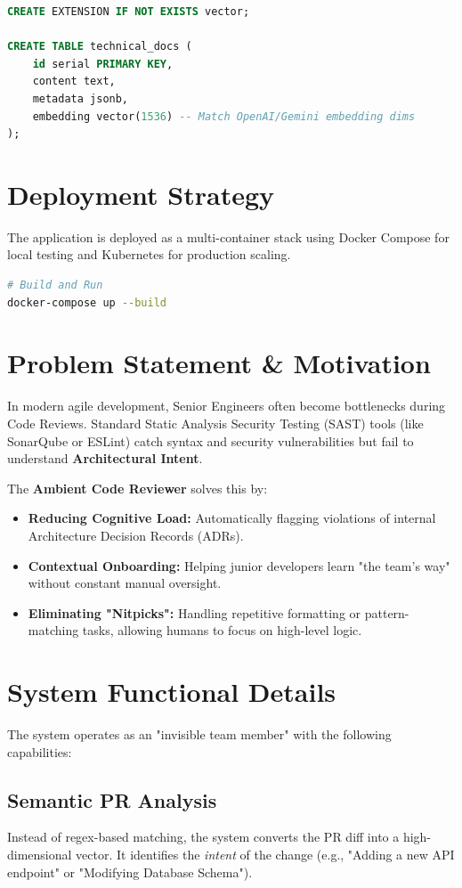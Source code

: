 \documentclass[11pt]{article}
\begin{document}
\begin{lstlisting}[language=sql, caption=Database Schema]
CREATE EXTENSION IF NOT EXISTS vector;

CREATE TABLE technical_docs (
    id serial PRIMARY KEY,
    content text,
    metadata jsonb,
    embedding vector(1536) -- Match OpenAI/Gemini embedding dims
);
\end{lstlisting}

\section{Deployment Strategy}
The application is deployed as a multi-container stack using Docker Compose for local testing and Kubernetes for production scaling.

\begin{lstlisting}[language=bash]
# Build and Run
docker-compose up --build
\end{lstlisting}
\section{Problem Statement \& Motivation}
In modern agile development, Senior Engineers often become bottlenecks during Code Reviews. Standard Static Analysis Security Testing (SAST) tools (like SonarQube or ESLint) catch syntax and security vulnerabilities but fail to understand \textbf{Architectural Intent}.

The \textbf{Ambient Code Reviewer} solves this by:
\begin{itemize}
    \item \textbf{Reducing Cognitive Load:} Automatically flagging violations of internal Architecture Decision Records (ADRs).
    \item \textbf{Contextual Onboarding:} Helping junior developers learn "the team's way" without constant manual oversight.
    \item \textbf{Eliminating "Nitpicks":} Handling repetitive formatting or pattern-matching tasks, allowing humans to focus on high-level logic.
\end{itemize}

\section{System Functional Details}
The system operates as an "invisible team member" with the following capabilities:

\subsection{Semantic PR Analysis}
Instead of regex-based matching, the system converts the PR diff into a high-dimensional vector. It identifies the \textit{intent} of the change (e.g., "Adding a new API endpoint" or "Modifying Database Schema").
\end{document}
